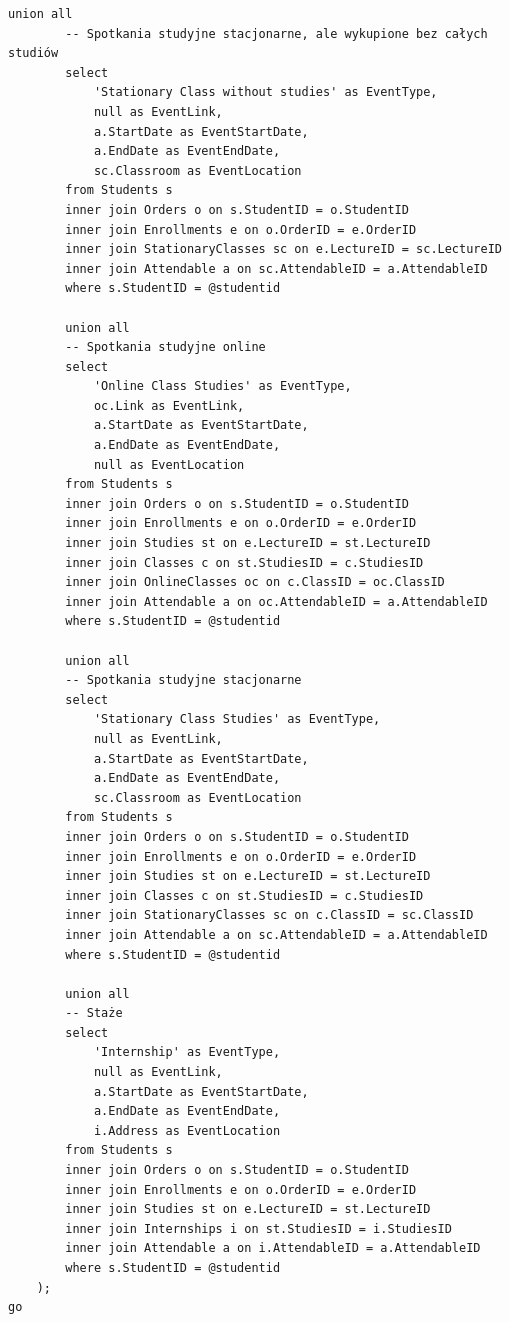 \documentclass[11pt,a4paper]{article}
\begin{document}
\begin{Verbatim}[breaklines=true]
        union all
        -- Spotkania studyjne stacjonarne, ale wykupione bez całych studiów
        select
            'Stationary Class without studies' as EventType,
            null as EventLink,
            a.StartDate as EventStartDate,
            a.EndDate as EventEndDate,
            sc.Classroom as EventLocation
        from Students s
        inner join Orders o on s.StudentID = o.StudentID
        inner join Enrollments e on o.OrderID = e.OrderID
        inner join StationaryClasses sc on e.LectureID = sc.LectureID
        inner join Attendable a on sc.AttendableID = a.AttendableID
        where s.StudentID = @studentid

        union all
        -- Spotkania studyjne online
        select
            'Online Class Studies' as EventType,
            oc.Link as EventLink,
            a.StartDate as EventStartDate,
            a.EndDate as EventEndDate,
            null as EventLocation
        from Students s
        inner join Orders o on s.StudentID = o.StudentID
        inner join Enrollments e on o.OrderID = e.OrderID
        inner join Studies st on e.LectureID = st.LectureID
        inner join Classes c on st.StudiesID = c.StudiesID
        inner join OnlineClasses oc on c.ClassID = oc.ClassID
        inner join Attendable a on oc.AttendableID = a.AttendableID
        where s.StudentID = @studentid

        union all
        -- Spotkania studyjne stacjonarne
        select
            'Stationary Class Studies' as EventType,
            null as EventLink,
            a.StartDate as EventStartDate,
            a.EndDate as EventEndDate,
            sc.Classroom as EventLocation
        from Students s
        inner join Orders o on s.StudentID = o.StudentID
        inner join Enrollments e on o.OrderID = e.OrderID
        inner join Studies st on e.LectureID = st.LectureID
        inner join Classes c on st.StudiesID = c.StudiesID
        inner join StationaryClasses sc on c.ClassID = sc.ClassID
        inner join Attendable a on sc.AttendableID = a.AttendableID
        where s.StudentID = @studentid

        union all
        -- Staże
        select
            'Internship' as EventType,
            null as EventLink,
            a.StartDate as EventStartDate,
            a.EndDate as EventEndDate,
            i.Address as EventLocation
        from Students s
        inner join Orders o on s.StudentID = o.StudentID
        inner join Enrollments e on o.OrderID = e.OrderID
        inner join Studies st on e.LectureID = st.LectureID
        inner join Internships i on st.StudiesID = i.StudiesID
        inner join Attendable a on i.AttendableID = a.AttendableID
        where s.StudentID = @studentid
    );
go
\end{Verbatim}
\end{document}
